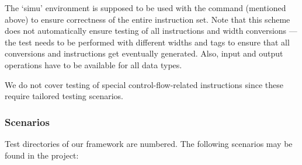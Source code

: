The `simu' environment is supposed to be used with the  command (mentioned above) to ensure correctness of the entire instruction set. Note that this scheme does not automatically ensure testing of all instructions and width conversions --- the test needs to be performed with different widths and tags to ensure that all conversions and instructions get eventually generated. Also, input and output operations have to be available for all data types.

We do not cover testing of special control-flow-related instructions since these require tailored testing scenarios.


\subsubsection{Scenarios}

Test directories of our framework are numbered. The following scenarios may be found in the project:

